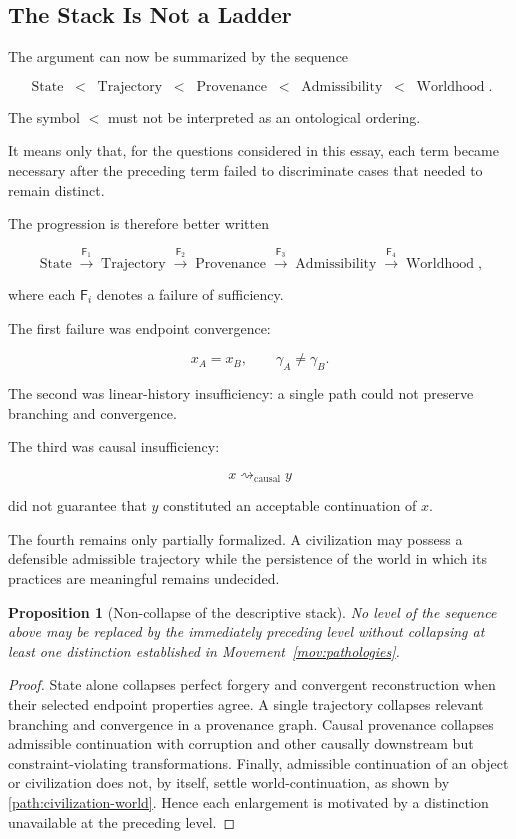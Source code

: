 \documentclass[
  11pt,
  a4paper,
  DIV=12,
  BCOR=0mm,
  parskip=half-
]{scrartcl}
\newcommand{\leadcausal}{%
  \mathrel{\rightsquigarrow_{\mathrm{causal}}}%
}
\newcommand{\State}{\operatorname{State}}
\newcommand{\Trajectory}{\operatorname{Trajectory}}
\newcommand{\Provenance}{\operatorname{Provenance}}
\newcommand{\Admissibility}{\operatorname{Admissibility}}
\newcommand{\Worldhood}{\operatorname{Worldhood}}
\theoremstyle{definition}
\theoremstyle{plain}
\newtheorem{proposition}[definition]{Proposition}
\theoremstyle{remark}
\begin{document}
\subsection{The Stack Is Not a Ladder}
\label{sec:stack-not-ladder}

The argument can now be summarized by the sequence

\[
  \State
  \;<\;
  \Trajectory
  \;<\;
  \Provenance
  \;<\;
  \Admissibility
  \;<\;
  \Worldhood.
\]

The symbol \(<\) must not be interpreted as an ontological ordering.

It means only that, for the questions considered in this essay, each term
became necessary after the preceding term failed to discriminate cases that
needed to remain distinct.

The progression is therefore better written

\[
  \State
  \xrightarrow{\mathsf F_1}
  \Trajectory
  \xrightarrow{\mathsf F_2}
  \Provenance
  \xrightarrow{\mathsf F_3}
  \Admissibility
  \xrightarrow{\mathsf F_4}
  \Worldhood,
\]

where each \(\mathsf F_i\) denotes a failure of sufficiency.

The first failure was endpoint convergence:

\[
  x_A=x_B,
  \qquad
  \gamma_A\neq\gamma_B.
\]

The second was linear-history insufficiency: a single path could not preserve
branching and convergence.

The third was causal insufficiency:

\[
  x\leadcausal y
\]

did not guarantee that \(y\) constituted an acceptable continuation of \(x\).

The fourth remains only partially formalized. A civilization may possess a
defensible admissible trajectory while the persistence of the world in which
its practices are meaningful remains undecided.

\begin{proposition}[Non-collapse of the descriptive stack]
\label{prop:noncollapse-stack}
No level of the sequence above may be replaced by the immediately preceding
level without collapsing at least one distinction established in
Movement~\ref{mov:pathologies}.
\end{proposition}

\begin{proof}
State alone collapses perfect forgery and convergent reconstruction when their
selected endpoint properties agree. A single trajectory collapses relevant
branching and convergence in a provenance graph. Causal provenance collapses
admissible continuation with corruption and other causally downstream but
constraint-violating transformations. Finally, admissible continuation of an
object or civilization does not, by itself, settle world-continuation, as
shown by \cref{path:civilization-world}. Hence each enlargement is motivated
by a distinction unavailable at the preceding level.
\end{proof}
\end{document}
